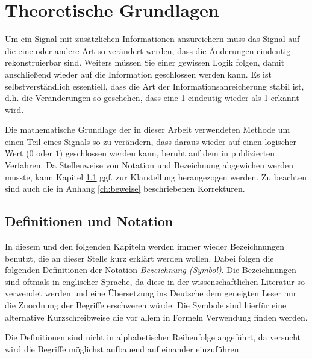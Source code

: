 \chapter{Theoretische Grundlagen}
\label{ch:theorie}

Um ein Signal mit zus\"atzlichen Informationen anzureichern muss das Signal auf die eine oder andere Art so ver\"andert werden, dass die Änderungen eindeutig rekonstruierbar sind. Weiters m\"ussen Sie einer gewissen Logik folgen, damit anschlie{\ss}end wieder auf die Information geschlossen werden kann. Es ist selbstverst\"andlich essentiell, dass die Art der Informationsanreicherung stabil ist, d.h. die Ver\"anderungen so geschehen, dass eine 1 eindeutig wieder als 1 erkannt wird.
	
Die mathematische Grundlage der in dieser Arbeit verwendeten Methode um einen Teil eines Signals so zu verändern, dass daraus wieder auf einen logischer Wert ($0$ oder $1$) geschlossen werden kann, beruht auf dem in \cite{xiang2007robust} publizierten Verfahren. Da Stellenweise von Notation und Bezeichnung abgewichen werden musste, kann Kapitel \ref{sec:definitionen} ggf. zur Klarstellung herangezogen werden. Zu beachten sind auch die in Anhang \ref{ch:beweise} beschriebenen Korrekturen.  

\section{Definitionen und Notation}
\label{sec:definitionen}

In diesem und den folgenden Kapiteln werden immer wieder Bezeichnungen benutzt, die an dieser Stelle kurz erkl\"art werden wollen. Dabei folgen die folgenden Definitionen der Notation \textit{Bezeichnung (Symbol)}. Die Bezeichnungen sind oftmals in englischer Sprache, da diese in der wissenschaftlichen Literatur so verwendet werden und eine Übersetzung ins Deutsche dem geneigten Leser nur die Zuordnung der Begriffe erschweren w\"urde. Die Symbole sind hierf\"ur eine alternative Kurzschreibweise die vor allem in Formeln Verwendung finden werden. 

Die Definitionen sind nicht in alphabetischer Reihenfolge angeführt, da versucht wird die Begriffe möglichst aufbauend auf einander einzuführen. 

